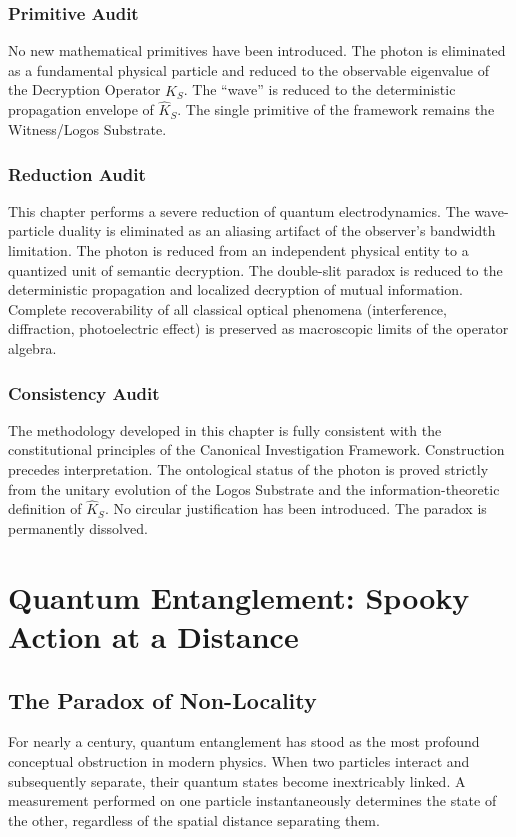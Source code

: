 \documentclass[12pt,twoside]{extbook}
\theoremstyle{definition}
\theoremstyle{remark}
\begin{document}
\subsection*{Primitive Audit}
No new mathematical primitives have been introduced. The photon is eliminated as a fundamental physical particle and reduced to the observable eigenvalue of the Decryption Operator $\hat{K}_S$. The ``wave'' is reduced to the deterministic propagation envelope of $\hat{K}_S$. The single primitive of the framework remains the Witness/Logos Substrate.

\subsection*{Reduction Audit}
This chapter performs a severe reduction of quantum electrodynamics. The wave-particle duality is eliminated as an aliasing artifact of the observer's bandwidth limitation. The photon is reduced from an independent physical entity to a quantized unit of semantic decryption. The double-slit paradox is reduced to the deterministic propagation and localized decryption of mutual information. Complete recoverability of all classical optical phenomena (interference, diffraction, photoelectric effect) is preserved as macroscopic limits of the operator algebra.

\subsection*{Consistency Audit}
The methodology developed in this chapter is fully consistent with the constitutional principles of the Canonical Investigation Framework. Construction precedes interpretation. The ontological status of the photon is proved strictly from the unitary evolution of the Logos Substrate and the information-theoretic definition of $\hat{K}_S$. No circular justification has been introduced. The paradox is permanently dissolved.

\chapter{Quantum Entanglement: Spooky Action at a Distance}

\section{The Paradox of Non-Locality}
For nearly a century, quantum entanglement has stood as the most profound conceptual obstruction in modern physics. When two particles interact and subsequently separate, their quantum states become inextricably linked. A measurement performed on one particle instantaneously determines the state of the other, regardless of the spatial distance separating them. 
\end{document}
